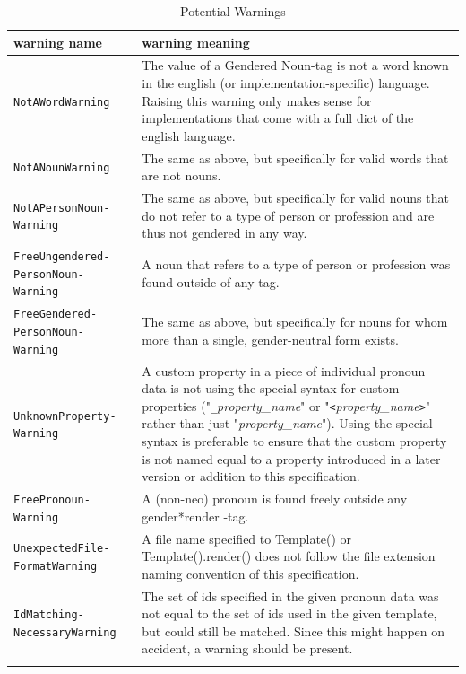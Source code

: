 \documentclass{article}
\newcommand{\GenderRender}{
    gender*render
}
\begin{document}
    \begin{flushleft}
        \begin{center}
            \begin{longtable}{|>{\raggedright\arraybackslash}p{8em} | >{\raggedright\arraybackslash}p{28em} |}
                 \hline
                 warning name & warning meaning\\
                 \hline\hline
                 \texttt{NotAWordWarning} & The value of a Gendered Noun-tag is not a word known in the english (or implementation-specific) language.
                 Raising this warning only makes sense for implementations that come with a full dict of the english language.\\
                 \hline
                 \texttt{NotANounWarning} & The same as above, but specifically for valid words that are not nouns.\\
                 \hline
                 \texttt{NotAPersonNoun- Warning} & The same as above, but specifically for valid nouns that do not refer to a type of person or profession and are thus not gendered in any way.\\
                 \hline
                 \texttt{FreeUngendered- PersonNoun- Warning} & A noun that refers to a type of person or profession was found outside of any tag.\\
                 \hline
                 \texttt{FreeGendered- PersonNoun- Warning} & The same as above, but specifically for nouns for whom more than a single, gender-neutral form exists.\\
                 \hline
                 \texttt{UnknownProperty- Warning} & A custom property in a piece of individual pronoun data is not using the special syntax for custom properties ("\texttt{\_}\emph{property\_name}" or "\texttt{<}\emph{property\_name}\texttt{>}" rather than just "\emph{property\_name}").
                 Using the special syntax is preferable to ensure that the custom property is not named equal to a property introduced in a later version or addition to this specification.\\
                 \hline
                 \texttt{FreePronoun- Warning} & A (non-neo) pronoun is found freely outside any \GenderRender-tag.\\
                 \hline
                 \texttt{UnexpectedFile- FormatWarning} & A file name specified to Template() or Template().render() does not follow the file extension naming convention of this specification.\\
                 \hline
                 \texttt{IdMatching- NecessaryWarning} & The set of ids specified in the given pronoun data was not equal to the set of ids used in the given template, but could still be matched.
                 Since this might happen on accident, a warning should be present.\\
                 \hline
                \caption{Potential Warnings}
            \end{longtable}
        \end{center}
    \end{flushleft}
\end{document}
